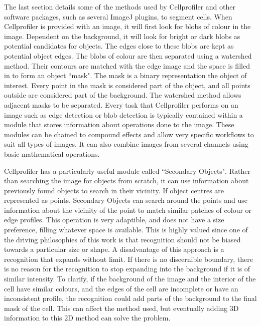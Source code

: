 The last section details some of the methods used by Cellprofiler and other software packages, such as several ImageJ plugins, to segment cells. When Cellprofiler is provided with an image, it will first look for blobs of colour in the image. Dependent on the background, it will look for bright or dark blobs as potential candidates for objects. The edges close to these blobs are kept as potential object edges. The blobs of colour are then separated using a watershed method. Their contours are matched with the edge image and the space is filled in to form an object ``mask". The mask is a binary representation the object of interest. Every point in the mask is considered part of the object, and all points outside are considered part of the background. The watershed method allows adjacent masks to be separated. Every task that Cellprofiler performs on an image such as edge detection or blob detection is typically contained within a module that stores information about operations done to the image. These modules can be chained to compound effects and allow very specific workflows to suit all types of images. It can also combine images from several channels using basic mathematical operations.

Cellprofiler has a particularly useful module called ``Secondary Objects". Rather than searching the image for objects from scratch, it can use information about previously found objects to search in their vicinity. If object centres are represented as points, Secondary Objects can search around the points and use information about the vicinity of the point to match similar patches of colour or edge profiles. This operation is very adaptible, and does not have a size preference, filling whatever space is available. This is highly valued since one of the driving philosophies of this work is that recognition should not be biased towards a particular size or shape. A disadvantage of this approach is a recognition that expands without limit. If there is no discernible boundary, there is no reason for the recognition to stop expanding into the background if it is of similar intensity. To clarify, if the background of the image and the interior of the cell have similar colours, and the edges of the cell are incomplete or have an inconsistent profile, the recognition could add parts of the background to the final mask of the cell. This can affect the method used, but eventually adding 3D information to this 2D method can solve the problem.

